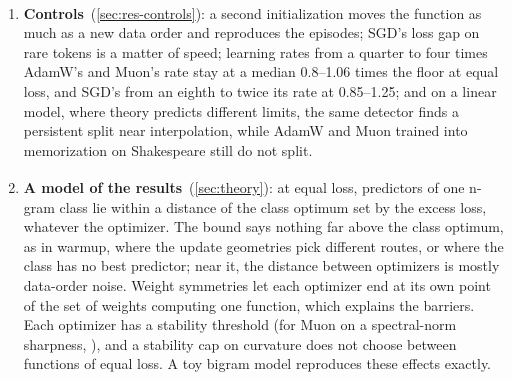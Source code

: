 \documentclass[10pt]{article}
\newcommand{\extra}{\textsuperscript{\dag}}  %
\begin{document}
\begin{enumerate}[leftmargin=1.5em]
  layers' shares of the top eigenvector of the stability operator, or the curvature along each layer's step. For
  SGD they match its re-tuned rate, as a rate tuned on the fly; for AdamW and Muon every layer sits at its own edge
  whatever its rate, so stability cannot allocate rates across layers.
\item \textbf{Controls}\extra\ (\cref{sec:res-controls}): a second initialization moves the function as much as a
  new data order and reproduces the episodes; SGD's loss gap on rare tokens is a matter of speed; learning rates
  from a quarter to four times AdamW's and Muon's rate stay at a median 0.8--1.06 times the floor at equal loss,
  and SGD's from an eighth to twice its rate at 0.85--1.25; and on a
  linear model, where theory predicts different limits, the same detector finds a persistent split near
  interpolation, while AdamW and Muon trained into memorization on Shakespeare still do not split.
\item \textbf{A model of the results}\extra\ (\cref{sec:theory}): at equal loss, predictors of one n-gram class
  lie within a distance of the class optimum set by the excess loss, whatever the optimizer. The bound says
  nothing far above the class optimum, as in warmup, where the update geometries pick different routes, or where
  the class has no best predictor; near it, the distance between optimizers is mostly data-order noise. Weight
  symmetries let each optimizer end at its own point of the set of weights computing one function, which
  explains the barriers. Each optimizer has a stability threshold (for Muon on a spectral-norm sharpness,
  \citealp{islamov2026noneuclidean}), and a stability cap on curvature does not choose between functions of
  equal loss. A toy bigram model reproduces these effects exactly.
\end{enumerate}
\end{document}
